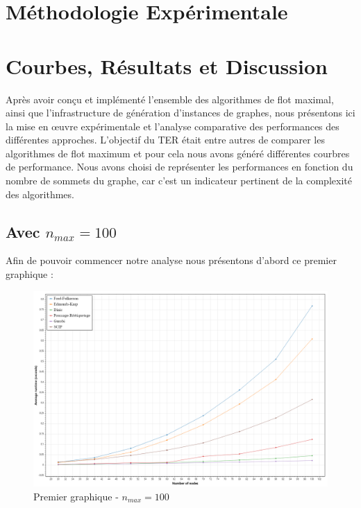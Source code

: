 \documentclass[a4paper]{article}
\begin{document}
\section{Méthodologie Expérimentale}


\section{Courbes, Résultats et Discussion}

Après avoir conçu et implémenté l’ensemble des algorithmes de flot maximal, ainsi que l’infrastructure de génération d’instances de graphes, nous présentons ici la mise en œuvre expérimentale et l’analyse comparative des performances des différentes approches. L'objectif du TER était entre autres de comparer les algorithmes de flot maximum et pour cela nous avons généré différentes courbres de performance. Nous avons choisi de représenter les performances en fonction du nombre de sommets du graphe, car c'est un indicateur pertinent de la complexité des algorithmes.\\

\subsection{Avec $n_{max} = 100$}

Afin de pouvoir commencer notre analyse nous présentons d'abord ce premier graphique :

\begin{figure}[h]
    \centering
    \includegraphics[width=1\textwidth]{courbes/benchmark_global_average_100.png}
    \caption{Premier graphique - $n_{max} = 100$}
    \label{fig:example}
\end{figure}
\end{document}
